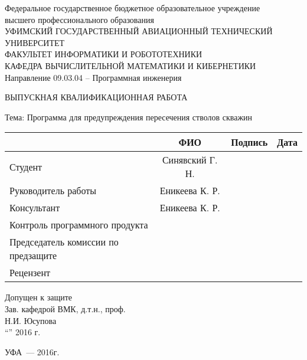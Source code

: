 \begin{titlepage}
\newpage

\begin{center}
Федеральное государственное бюджетное образовательное учреждение\\
высшего профессионального образования \\
\vspace{0.5cm}
УФИМСКИЙ ГОСУДАРСТВЕННЫЙ АВИАЦИОННЫЙ ТЕХНИЧЕСКИЙ УНИВЕРСИТЕТ\\
\vspace{0.5cm}
ФАКУЛЬТЕТ  ИНФОРМАТИКИ  И  РОБОТОТЕХНИКИ \\
\vspace{0.5cm}
КАФЕДРА  ВЫЧИСЛИТЕЛЬНОЙ  МАТЕМАТИКИ  И  КИБЕРНЕТИКИ\\
\vspace{0.5cm}
Направление 09.03.04 – Программная инженерия
\end{center}

\vspace{2em}

\begin{center}
\Large {ВЫПУСКНАЯ КВАЛИФИКАЦИОННАЯ РАБОТА}

\vspace{2.5em}

Тема: Программа для предупреждения пересечения стволов скважин
\end{center}

\vspace{3em}
\noindent
\begin{tabularx}{\textwidth}{|l|c|X|X|}
\hline
& ФИО & Подпись & Дата\\
\hline
Студент & Синявский Г. Н. &&\\
\hline
Руководитель работы & Еникеева К. Р. &&\\
\hline
Консультант & Еникеева К. Р. &&\\
\hline
Контроль программного продукта &&&\\
\hline
Председатель комиссии по предзащите &&&\\
\hline
Рецензент &&& \\
\hline
\end{tabularx}

\vspace{2em}
\center Допущен к защите\\
Зав. кафедрой  ВМК, д.т.н., проф.\\
\underline{\hspace{5cm}} Н.И. Юсупова\\
“\underline{\hspace{1cm}}”\underline{\hspace{5cm}} 2016 г.

\vspace{\fill}

\begin{center}
УФА~--- 2016г.
\end{center}

\end{titlepage}
